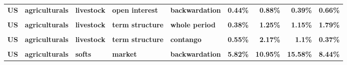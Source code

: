 \documentclass[
  authoryear,
  preprint,
  3p]{elsarticle}
\begin{document}
\begin{landscape}
\begin{longtable}[t]{>{}l>{}l>{}l>{}l>{}l>{}r>{}r>{}r>{}r}
\addlinespace
\textbf{US} & \textbf{agriculturals} & \textbf{livestock} & \textbf{open interest} & \textbf{backwardation} & \textcolor[HTML]{4285f4}{\textbf{0.44\%}} & \textcolor[HTML]{4285f4}{\textbf{0.88\%}} & \textcolor[HTML]{4285f4}{\textbf{0.39\%}} & \textcolor[HTML]{4285f4}{\textbf{0.66\%}}\\
\textbf{\cellcolor{gray!10}{US}} & \textbf{\cellcolor{gray!10}{agriculturals}} & \textbf{\cellcolor{gray!10}{livestock}} & \textbf{\cellcolor{gray!10}{open interest}} & \textbf{\cellcolor{gray!10}{contango}} & \textcolor[HTML]{4285f4}{\textbf{\cellcolor{gray!10}{0.5\%}}} & \textcolor[HTML]{4285f4}{\textbf{\cellcolor{gray!10}{0.3\%}}} & \textcolor[HTML]{4285f4}{\textbf{\cellcolor{gray!10}{0.19\%}}} & \textcolor[HTML]{4285f4}{\textbf{\cellcolor{gray!10}{0.28\%}}}\\
\textbf{US} & \textbf{agriculturals} & \textbf{livestock} & \textbf{term structure} & \textbf{whole period} & \textcolor[HTML]{4285f4}{\textbf{0.38\%}} & \textcolor[HTML]{4285f4}{\textbf{1.25\%}} & \textcolor[HTML]{4285f4}{\textbf{1.15\%}} & \textcolor[HTML]{4285f4}{\textbf{1.79\%}}\\
\textbf{\cellcolor{gray!10}{US}} & \textbf{\cellcolor{gray!10}{agriculturals}} & \textbf{\cellcolor{gray!10}{livestock}} & \textbf{\cellcolor{gray!10}{term structure}} & \textbf{\cellcolor{gray!10}{backwardation}} & \textcolor[HTML]{4285f4}{\textbf{\cellcolor{gray!10}{0.59\%}}} & \textcolor[HTML]{4285f4}{\textbf{\cellcolor{gray!10}{1.09\%}}} & \textcolor[HTML]{4285f4}{\textbf{\cellcolor{gray!10}{1.43\%}}} & \textcolor[HTML]{4285f4}{\textbf{\cellcolor{gray!10}{4.47\%}}}\\
\textbf{US} & \textbf{agriculturals} & \textbf{livestock} & \textbf{term structure} & \textbf{contango} & \textcolor[HTML]{4285f4}{\textbf{0.55\%}} & \textcolor[HTML]{4285f4}{\textbf{2.17\%}} & \textcolor[HTML]{4285f4}{\textbf{1.1\%}} & \textcolor[HTML]{4285f4}{\textbf{0.37\%}}\\
\addlinespace
\textbf{\cellcolor{gray!10}{US}} & \textbf{\cellcolor{gray!10}{agriculturals}} & \textbf{\cellcolor{gray!10}{softs}} & \textbf{\cellcolor{gray!10}{market}} & \textbf{\cellcolor{gray!10}{whole period}} & \textcolor[HTML]{4285f4}{\textbf{\cellcolor{gray!10}{4.78\%}}} & \textcolor[HTML]{4285f4}{\textbf{\cellcolor{gray!10}{9.9\%}}} & \textcolor[HTML]{4285f4}{\textbf{\cellcolor{gray!10}{18.39\%}}} & \textcolor[HTML]{4285f4}{\textbf{\cellcolor{gray!10}{8.48\%}}}\\
\textbf{US} & \textbf{agriculturals} & \textbf{softs} & \textbf{market} & \textbf{backwardation} & \textcolor[HTML]{4285f4}{\textbf{5.82\%}} & \textcolor[HTML]{4285f4}{\textbf{10.95\%}} & \textcolor[HTML]{4285f4}{\textbf{15.58\%}} & \textcolor[HTML]{4285f4}{\textbf{8.44\%}}\\

\end{longtable}
\end{landscape}
\end{document}
